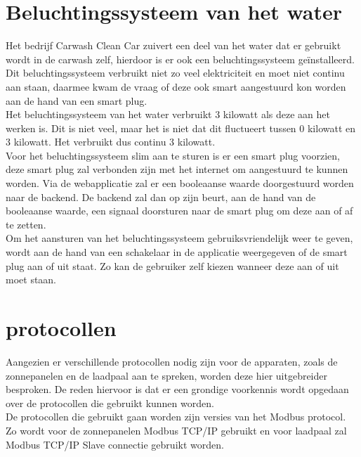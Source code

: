 \section{Beluchtingssysteem van het water}
\label{sec:stand-van-zaken-beluchtingssysteem}

Het bedrijf Carwash Clean Car zuivert een deel van het water dat er gebruikt wordt in de carwash zelf, hierdoor is er ook een beluchtingssysteem geïnstalleerd. Dit beluchtingssysteem verbruikt niet zo veel elektriciteit en moet niet continu aan staan, daarmee kwam de vraag of deze ook smart aangestuurd kon worden aan de hand van een smart plug.\\

Het beluchtingssysteem van het water verbruikt 3 kilowatt als deze aan het werken is. Dit is niet veel, maar het is niet dat dit fluctueert tussen 0 kilowatt en 3 kilowatt. Het verbruikt dus continu 3 kilowatt.\\

Voor het beluchtingssysteem slim aan te sturen is er een smart plug voorzien, deze smart plug zal verbonden zijn met het internet om aangestuurd te kunnen worden. Via de webapplicatie zal er een booleaanse waarde doorgestuurd worden naar de backend. De backend zal dan op zijn beurt, aan de hand van de booleaanse waarde, een signaal doorsturen naar de smart plug om deze aan of af te zetten.\\

Om het aansturen van het beluchtingssysteem gebruiksvriendelijk weer te geven, wordt aan de hand van een schakelaar in de applicatie weergegeven of de smart plug aan of uit staat. Zo kan de gebruiker zelf kiezen wanneer deze aan of uit moet staan.

\section{protocollen}
\label{sec:stand-van-zaken-protocollen}

Aangezien er verschillende protocollen nodig zijn voor de apparaten, zoals de zonnepanelen en de laadpaal aan te spreken, worden deze hier uitgebreider besproken. De reden hiervoor is dat er een grondige voorkennis wordt opgedaan over de protocollen die gebruikt kunnen worden.\\

De protocollen die gebruikt gaan worden zijn versies van het Modbus protocol. Zo wordt voor de zonnepanelen Modbus TCP/IP gebruikt en voor laadpaal zal Modbus TCP/IP Slave connectie gebruikt worden.\\

